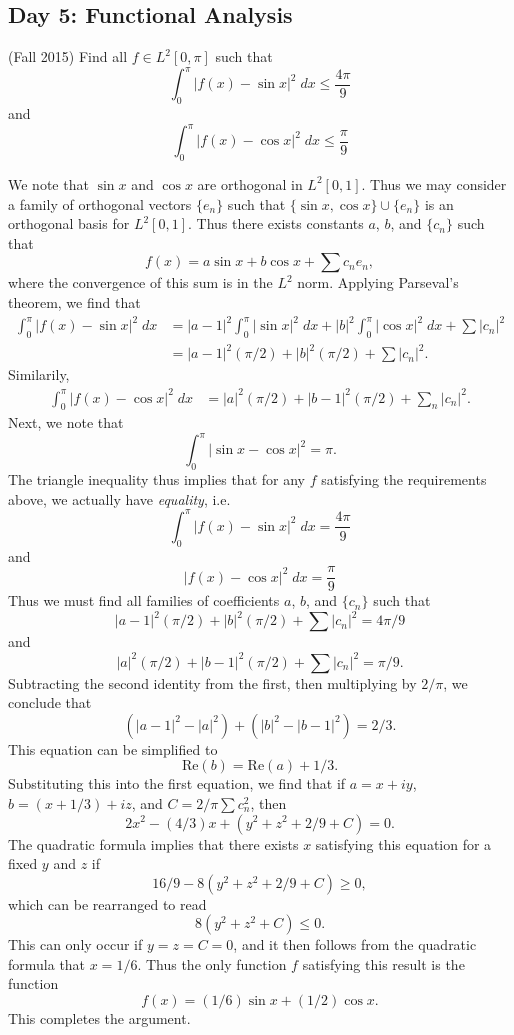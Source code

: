 \documentclass[answers]{exam}
\theoremstyle{problemstyle}
\newcommand{\1}[1]{\textbf{1}_{\left[#1\right]}} %
\begin{document}
\begin{questions}
\newpage
\section{Day 5: Functional Analysis}

\question (Fall 2015) Find all $f \in L^2[0,\pi]$ such that
%
\[ \int_0^\pi |f(x) - \sin x|^2\; dx \leq \frac{4\pi}{9} \]
%
and
%
\[ \int_0^\pi |f(x) - \cos x|^2\; dx \leq \frac{\pi}{9} \]
\begin{solution}
    We note that $\sin x$ and $\cos x$ are orthogonal in $L^2[0,1]$. Thus we may consider a family of orthogonal vectors $\{ e_n \}$ such that $\{ \sin x, \cos x \} \cup \{ e_n \}$ is an orthogonal basis for $L^2[0,1]$. Thus there exists constants $a$, $b$, and $\{ c_n \}$ such that
    \[ f(x) = a \sin x + b \cos x + \sum c_n e_n, \]
    where the convergence of this sum is in the $L^2$ norm. Applying Parseval's theorem, we find that
    \begin{align*}
        \int_0^\pi |f(x) - \sin x|^2\; dx &= |a - 1|^2 \int_0^\pi |\sin x|^2\; dx + |b|^2 \int_0^\pi |\cos x|^2\; dx + \sum |c_n|^2\\
        &= |a - 1|^2 (\pi/2) + |b|^2 (\pi/2) + \sum |c_n|^2.
    \end{align*}
    Similarily,
    \begin{align*}
        \int_0^\pi |f(x) - \cos x|^2\; dx &= |a|^2 (\pi/2) + |b - 1|^2 (\pi/2) + \sum_n |c_n|^2.
    \end{align*}
    Next, we note that
    \[ \int_0^\pi |\sin x - \cos x|^2 = \pi. \]
    The triangle inequality thus implies that for any $f$ satisfying the requirements above, we actually have \emph{equality}, i.e.
    \[ \int_0^\pi |f(x) - \sin x|^2\; dx = \frac{4\pi}{9} \]
    and
    \[ |f(x) - \cos x|^2\; dx = \frac{\pi}{9} \]
    Thus we must find all families of coefficients $a$, $b$, and $\{ c_n \}$ such that
    \[ |a - 1|^2 (\pi/2) + |b|^2 (\pi / 2) + \sum |c_n|^2 = 4 \pi / 9 \]
    and
    \[ |a|^2 (\pi/2) + |b - 1|^2 (\pi / 2) + \sum |c_n|^2 = \pi / 9. \]
    Subtracting the second identity from the first, then multiplying by $2/\pi$, we conclude that
    \[ (|a - 1|^2 - |a|^2) + (|b|^2 - |b-1|^2) = 2/3. \]
    This equation can be simplified to
    \[ \text{Re}(b) = \text{Re}(a) + 1/3. \]
    Substituting this into the first equation, we find that if $a = x + iy$, $b = (x + 1/3) + iz$, and $C = 2/\pi \sum c_n^2$, then
    \[ 2x^2 - (4/3)x + (y^2 + z^2 + 2/9 + C) = 0. \]
    The quadratic formula implies that there exists $x$ satisfying this equation for a fixed $y$ and $z$ if
    \[ 16/9 - 8(y^2 + z^2 + 2/9 + C) \geq 0, \]
    which can be rearranged to read
    \[ 8(y^2 + z^2 + C) \leq 0. \]
    This can only occur if $y = z = C = 0$, and it then follows from the quadratic formula that $x = 1/6$. Thus the only function $f$ satisfying this result is the function
    \[ f(x) = (1/6) \sin x + (1/2) \cos x. \]
    This completes the argument.


\end{solution}
\end{questions}
\end{document}
